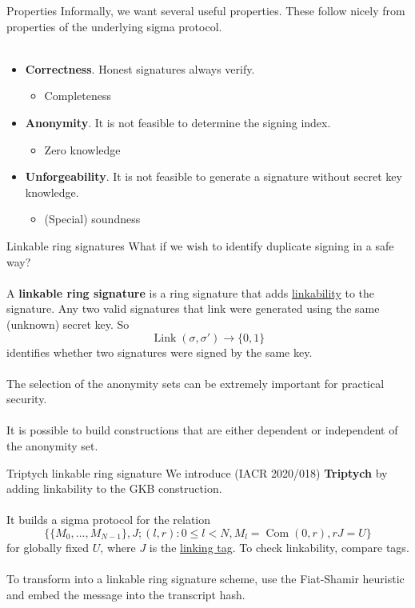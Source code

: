 \documentclass[aspectratio=169]{beamer}
\newcommand{\com}{\operatorname{Com}}
\begin{document}
\begin{frame}{Properties}
Informally, we want several useful properties. These follow nicely from properties of the underlying sigma protocol.
\\~\\
\begin{itemize}
\item \textbf{Correctness}. Honest signatures always verify.
\begin{itemize}
\item Completeness
\end{itemize}
\item \textbf{Anonymity}. It is not feasible to determine the signing index.
\begin{itemize}
\item Zero knowledge
\end{itemize}
\item \textbf{Unforgeability}. It is not feasible to generate a signature without secret key knowledge.
\begin{itemize}
\item (Special) soundness
\end{itemize}
\end{itemize}
\end{frame}


\begin{frame}{Linkable ring signatures}
What if we wish to identify duplicate signing in a safe way?
\\~\\
A \textbf{linkable ring signature} is a ring signature that adds \underline{linkability} to the signature. Any two valid signatures that link were generated using the same (unknown) secret key. So
$$\operatorname{Link}(\sigma,\sigma') \to \{0,1\}$$
identifies whether two signatures were signed by the same key.
\\~\\
The selection of the anonymity sets can be extremely important for practical security.
\\~\\
It is possible to build constructions that are either dependent or independent of the anonymity set.
\end{frame}


\begin{frame}{Triptych linkable ring signature}
We introduce (IACR 2020/018) \textbf{Triptych} by adding linkability to the GKB construction.
\\~\\
It builds a sigma protocol for the relation
$$\Big\{\{M_0,\ldots,M_{N-1}\}, J;(l,r) : 0 \leq l < N, M_l = \com(0,r), rJ = U\Big\}$$
for globally fixed $U$, where $J$ is the \underline{linking tag}. To check linkability, compare tags.
\\~\\
To transform into a linkable ring signature scheme, use the Fiat-Shamir heuristic and embed the message into the transcript hash.
\end{frame}
\end{document}
